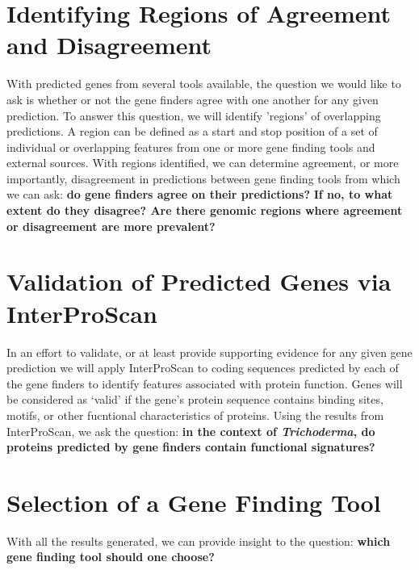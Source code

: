\section{Identifying Regions of Agreement and Disagreement} \label{identify-regions}

With predicted genes from several tools available, the question we
would like to ask is whether or not the gene finders agree with one
another for any given prediction. To answer this question, we will
identify 'regions' of overlapping predictions. A region can be defined
as a start and stop position of a set of individual or overlapping
features from one or more gene finding tools and external
sources. With regions identified, we can determine agreement, or more
importantly, disagreement in predictions between gene finding tools
from which we can ask: \textbf{do gene finders agree on their
  predictions?} \textbf{If no, to what extent do they disagree? Are
  there genomic regions where agreement or disagreement are more
  prevalent?}

\section{Validation of Predicted Genes via InterProScan}

In an effort to validate, or at least provide supporting evidence for
any given gene prediction we will apply InterProScan to coding
sequences predicted by each of the gene finders to identify features
associated with protein function. Genes will be considered as `valid'
if the gene's protein sequence contains binding sites, motifs, or
other fucntional characteristics of proteins. Using the results from
InterProScan, we ask the question: \textbf{in the context of
  \textit{Trichoderma}, do proteins predicted by gene finders contain
  functional signatures?}


\section{Selection of a Gene Finding Tool}

With all the results generated, we can provide insight to the
question: \textbf{which gene finding tool should one choose?}
